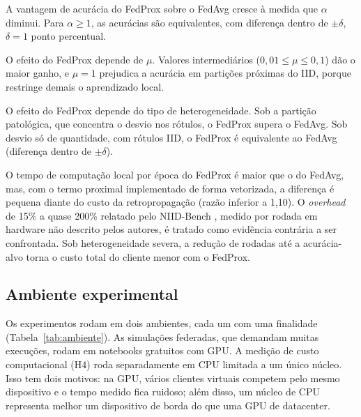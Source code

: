 \begin{description}[leftmargin=0pt, itemsep=2pt]
    \item[H1 (nível).] A vantagem de acurácia do FedProx sobre o FedAvg cresce à medida que $\alpha$ diminui. Para $\alpha \geq 1$, as acurácias são equivalentes, com diferença dentro de $\pm\delta$, $\delta = 1$ ponto percentual.
    \item[H2 ($\mu$).] O efeito do FedProx depende de $\mu$. Valores intermediários ($0{,}01 \leq \mu \leq 0{,}1$) dão o maior ganho, e $\mu = 1$ prejudica a acurácia em partições próximas do IID, porque restringe demais o aprendizado local.
    \item[H3 (tipo).] O efeito do FedProx depende do tipo de heterogeneidade. Sob a partição patológica, que concentra o desvio nos rótulos, o FedProx supera o FedAvg. Sob desvio só de quantidade, com rótulos IID, o FedProx é equivalente ao FedAvg (diferença dentro de $\pm\delta$).
    \item[H4 (custo).] O tempo de computação local por época do FedProx é maior que o do FedAvg, mas, com o termo proximal implementado de forma vetorizada, a diferença é pequena diante do custo da retropropagação (razão inferior a 1,10). O \textit{overhead} de 15\% a quase 200\% relatado pelo NIID-Bench \citep{li2022niidbench}, medido por rodada em hardware não descrito pelos autores, é tratado como evidência contrária a ser confrontada. Sob heterogeneidade severa, a redução de rodadas até a acurácia-alvo torna o custo total do cliente menor com o FedProx.
\end{description}

\subsection{Ambiente experimental}

Os experimentos rodam em dois ambientes, cada um com uma finalidade (Tabela~\ref{tab:ambiente}). As simulações federadas, que demandam muitas execuções, rodam em notebooks gratuitos com GPU. A medição de custo computacional (H4) roda separadamente em CPU limitada a um único núcleo. Isso tem dois motivos: na GPU, vários clientes virtuais competem pelo mesmo dispositivo e o tempo medido fica ruidoso; além disso, um núcleo de CPU representa melhor um dispositivo de borda do que uma GPU de datacenter.

